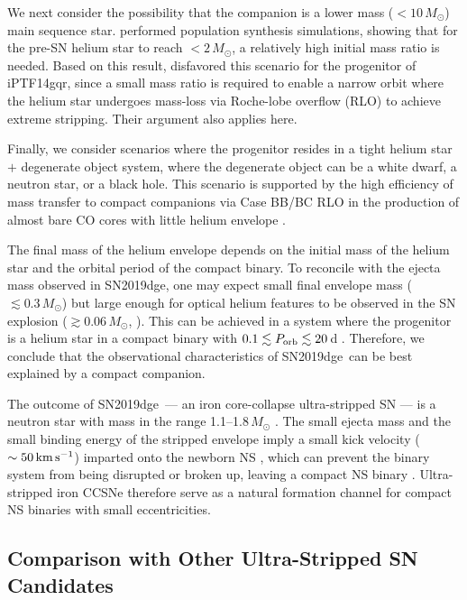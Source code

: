 \documentclass[twocolumn]{aastex63}
\newcommand{\name}{SN2019dge}
\begin{document}
\begin{CJK*}{UTF8}{gbsn}
We next consider the possibility that the companion is a lower mass ($<10\,M_\odot$) main sequence 
star. \citet{Zapartas2017} performed population synthesis simulations, showing that for the pre-SN 
helium star to reach $<2\, M_\odot$, a relatively high initial mass ratio is needed. Based on this result, 
\citet{De2018} disfavored this scenario for the progenitor of iPTF14gqr, since a small mass ratio is 
required to enable a narrow orbit where the helium star undergoes mass-loss via 
Roche-lobe overflow (RLO) to achieve extreme stripping. Their argument also applies here.  

Finally, we consider scenarios where the progenitor resides in a tight helium star $+$ degenerate object 
system, where the degenerate object can be a white dwarf, a neutron star, or a black hole. This 
scenario is supported by the high efficiency of mass transfer to compact companions via Case BB/BC 
RLO in the production of almost bare CO cores with little helium envelope \citep{Dewi2002, 
Tauris2012}. 

The final mass of the helium 
envelope depends on the initial mass of the helium star and the orbital period of the compact binary. 
To reconcile with the ejecta mass observed in \name, one may expect small final envelope mass 
($\lesssim0.3\,M_\odot$) but large enough for optical helium features to be observed in the SN 
explosion ($\gtrsim 0.06\, M_\odot$, \citealt{Hachinger2012}). This can be achieved in a system where 
the progenitor is a helium star in a compact binary with $0.1 \lesssim P_{\rm orb} \lesssim 20$\,d 
\citep{Tauris2015}. Therefore, we conclude that the observational characteristics of \name\ can be best 
explained by a compact companion.

The outcome of \name\ --- an iron core-collapse ultra-stripped SN --- is a neutron star with mass 
in the range 1.1--1.8\,$M_\odot$ \citep{Tauris2015}. The small ejecta mass and the small binding energy 
of the stripped envelope imply a small kick velocity ($\sim 50\,{\rm km\, s^{-1}}$) imparted onto the 
newborn NS \citep{Tauris2015, Suwa2015, Bray2016, Muller2018}, which can prevent the binary system 
from being disrupted or broken up, leaving a compact NS binary \citep{Tauris2017}. Ultra-stripped iron 
CCSNe therefore serve as a natural formation channel for compact NS binaries with small eccentricities. 

\subsection{Comparison with Other Ultra-Stripped SN Candidates}


\end{CJK*}
\end{document}
